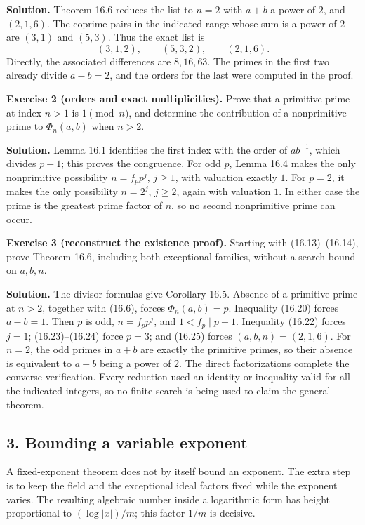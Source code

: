 \documentclass[
  11pt,
  a4paper,
]{article}
\begin{document}
\textbf{Solution.} Theorem 16.6 reduces the list to \(n=2\) with \(a+b\)
a power of \(2\), and \((2,1,6)\). The coprime pairs in the indicated
range whose sum is a power of \(2\) are \((3,1)\) and \((5,3)\). Thus
the exact list is \[
 (3,1,2),\qquad(5,3,2),\qquad(2,1,6).
 \tag{16.27}
\] Directly, the associated differences are \(8,16,63\). The primes in
the first two already divide \(a-b=2\), and the orders for the last were
computed in the proof.

\textbf{Exercise 2 (orders and exact multiplicities).} Prove that a
primitive prime at index \(n>1\) is \(1\pmod n\), and determine the
contribution of a nonprimitive prime to \(\Phi_n(a,b)\) when \(n>2\).

\textbf{Solution.} Lemma 16.1 identifies the first index with the order
of \(ab^{-1}\), which divides \(p-1\); this proves the congruence. For
odd \(p\), Lemma 16.4 makes the only nonprimitive possibility
\(n=f_pp^j\), \(j\geq1\), with valuation exactly \(1\). For \(p=2\), it
makes the only possibility \(n=2^j\), \(j\geq2\), again with valuation
\(1\). In either case the prime is the greatest prime factor of \(n\),
so no second nonprimitive prime can occur.

\textbf{Exercise 3 (reconstruct the existence proof).} Starting with
(16.13)--(16.14), prove Theorem 16.6, including both exceptional
families, without a search bound on \(a,b,n\).

\textbf{Solution.} The divisor formulas give Corollary 16.5. Absence of
a primitive prime at \(n>2\), together with (16.6), forces
\(\Phi_n(a,b)=p\). Inequality (16.20) forces \(a-b=1\). Then \(p\) is
odd, \(n=f_pp^j\), and \(1<f_p\mid p-1\). Inequality (16.22) forces
\(j=1\); (16.23)--(16.24) force \(p=3\); and (16.25) forces
\((a,b,n)=(2,1,6)\). For \(n=2\), the odd primes in \(a+b\) are exactly
the primitive primes, so their absence is equivalent to \(a+b\) being a
power of \(2\). The direct factorizations complete the converse
verification. Every reduction used an identity or inequality valid for
all the indicated integers, so no finite search is being used to claim
the general theorem.

\subsection{3. Bounding a variable
exponent}\label{bounding-a-variable-exponent}

A fixed-exponent theorem does not by itself bound an exponent. The extra
step is to keep the field and the exceptional ideal factors fixed while
the exponent varies. The resulting algebraic number inside a logarithmic
form has height proportional to \((\log|x|)/m\); this factor \(1/m\) is
decisive.
\end{document}
